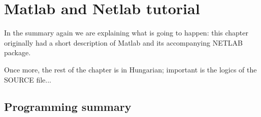 \chapter{Matlab and Netlab tutorial}\label{ch:PRACTICE}

\begin{summary}
  In the summary again we are explaining what is going to happen: this chapter originally had a short description of Matlab and its accompanying NETLAB package.

  Once more, the rest of the chapter is in Hungarian; important is the logics of the SOURCE file...
\end{summary}


\section{Programming summary}\label{sec:MAT:intro}

